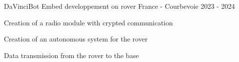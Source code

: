 \begin{cventries}
  \cventry
    {DaVinciBot} %
    {Embed developpement on rover} %
    {France - Courbevoie} %
    {2023 - 2024} %
    {
      \begin{cvitems} %
        \item {Creation of a radio module with crypted communication}
        \item {Creation of an autonomous system for the rover}
        \item {Data transmission from the rover to the base}
      \end{cvitems}
    }
    {}

\end{cventries}
